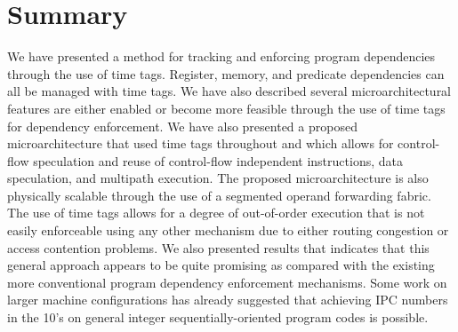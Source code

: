 \documentclass[10pt,twocolumn]{article}
\begin{document}
\section{Summary}
\vspace{-0.15in}
%
We have presented a method for tracking and enforcing
program dependencies through the use of time tags.
Register, memory, and predicate dependencies can all be
managed with time tags.
We have also described several microarchitectural
features are either enabled or become more feasible through
the use of time tags for dependency enforcement.
We have also presented a proposed microarchitecture that
used time tags throughout and which allows for
control-flow speculation and
reuse of
control-flow independent instructions,
data speculation,  and multipath execution.
The proposed microarchitecture is also physically scalable
through the use of a segmented operand forwarding fabric.
The use of time tags allows for a degree of out-of-order
execution that is not easily enforceable using any other
mechanism due to either routing congestion or access contention
problems.
We also presented results that indicates that this general 
approach appears to be quite
promising as compared with the existing more conventional program
dependency enforcement mechanisms.
Some work on larger machine configurations has already
suggested that achieving IPC numbers in the 10's on general integer
sequentially-oriented program codes is possible.
%


%
\end{document}
